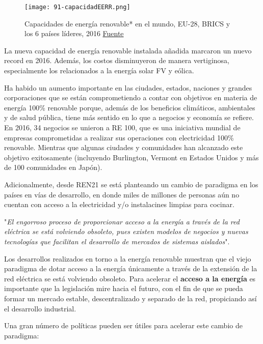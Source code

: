 \begin{figure}
\centering
\texttt{[image: 91-capacidadEERR.png]}
\caption[Capacidades de energía renovable* en el mundo]{Capacidades de energía renovable* en el mundo, EU-28, BRICS y los 6 países líderes, 2016 \href{http://www.ren21.net/wp-content/uploads/2017/07/17-8399_GSR_2017_KEY-FINDINGS_Spanish_lowres.pdf}{Fuente}}
\end{figure}

La nueva capacidad de energía renovable instalada añadida marcaron un
nuevo record en 2016. Además, los costos disminuyeron de manera
vertiginosa, especialmente los relacionados a la energía solar FV y
eólica.

Ha habido un aumento importante en las ciudades, estados, naciones y
grandes corporaciones que se están comprometiendo a contar con objetivos
en materia de energía 100\% renovable porque, además de los beneficios
climáticos, ambientales y de salud pública, tiene más sentido en lo que
a negocios y economía se refiere. En 2016, 34 negocios se unieron a RE
100, que es una iniciativa mundial de empresas comprometidas a realizar
sus operaciones con electricidad 100\% renovable. Mientras que algunas
ciudades y comunidades han alcanzado este objetivo exitosamente
(incluyendo Burlington, Vermont en Estados Unidos y más de 100
comunidades en Japón).

Adicionalmente, desde REN21 se está planteando un cambio de paradigma en
los países en vías de desarrollo, en donde miles de millones de personas
aún no cuentan con acceso a la electricidad y/o instalacines limpias
para cocinar.

"\emph{El engorroso proceso de proporcionar acceso a la energía a través
de la red eléctrica se está volviendo obsoleto, pues existen modelos de
negocios y nuevas tecnologías que facilitan el desarrollo de mercados de
sistemas aislados}".

Los desarrollos realizados en torno a la energía renovable muestran que
el viejo paradigma de dotar acceso a la energía únicamente a través de
la extensión de la red eléctrica se está volviendo obsoleto. Para
acelerar el \textbf{acceso a la energía} es importante que la
legislación mire hacia el futuro, con el fin de que se pueda formar un
mercado estable, descentralizado y separado de la red, propiciando así
el desarrollo industrial.

Una gran número de políticas pueden ser útiles para acelerar este cambio
de paradigma:

